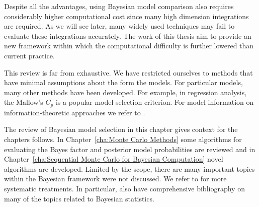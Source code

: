 Despite all the advantages, using Bayesian model comparison also requires
considerably higher computational cost since many high dimension integrations
are required. As we will see later, many widely used techniques may fail to
evaluate these integrations accurately. The work of this thesis aim to provide
an new framework within which the computational difficulty is further lowered
than current practice.

This review is far from exhaustive. We have restricted ourselves to methods
that have minimal assumptions about the form the models. For particular
models, many other methods have been developed. For example, in regression
analysis, the Mallow's $C_p$ is a popular model selection criterion. For model
information on information-theoretic approaches we refer to
\cite{Burnham:2002wc,Claeskens:2008tq}.

The review of Bayesian model selection in this chapter gives context for the
chapters follows. In Chapter~\ref{cha:Monte Carlo Methods} some algorithms for
evaluating the Bayes factor and posterior model probabilities are reviewed and
in Chapter~\ref{cha:Sequential Monte Carlo for Bayesian Computation} novel
algorithms are developed. Limited by the scope, there are many important
topics within the Bayesian framework were not discussed. We refer to
\cite{Bernardo:1994vd,Robert:2007tc} for more systematic treatments. In
particular, \cite{Bernardo:1994vd} also have comprehensive bibliography on
many of the topics related to Bayesian statistics.
